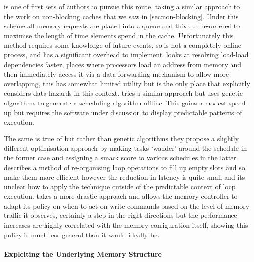 \citet{kiniwaLookaheadSchedulingRequests1998} is one of first sets of authors to pursue this route, taking a similar approach to the work on non-blocking caches that we saw in \ref{sec:non-blocking}. Under this scheme all memory requests are placed into a queue and this can re-ordered to maximise the length of time elements spend in the cache. Unfortunately this method requires some knowledge of future events, so is not a completely online process, and has a significant overhead to implement. \citet{yangOverlappingDependentLoads2006} looks at resolving load-load dependencies faster, places where processors load an address from memory and then immediately access it via a data forwarding mechanism to allow more overlapping, this has somewhat limited utility but is the only place that explicitly considers data hazards in this context. \citet{luoDesignRealizationOptimized2010} tries a similar approach but uses genetic algorithms to generate a scheduling algorithm offline. This gains a modest speed-up but requires the software under discussion to display predictable patterns of execution. 

The same is true of \citet{wei-chetsengOptimalSchedulingMinimize2010, kegleyPredictiveCacheModeling2011} but rather than genetic algorithms they propose a slightly different optimisation approach by making tasks `wander' around the schedule in the former case and assigning a \gls{smack} score to various schedules in the latter. \citet{qaziOptimizationAccessLatency2016} describes a method of re-organising loop operations to fill up empty slots and so make them more efficient however the reduction in latency is quite small and its unclear how to apply the technique outside of the predictable context of loop execution. \citet{modgilImprovingPerformanceChip2018} takes a more drastic approach and allows the memory controller to adapt its policy on when to act on write commands based on the level of memory traffic it observes, certainly a step in the right directions but the performance increases are highly correlated with the memory configuration itself, showing this policy is much less general than it would ideally be.

\paragraph{Exploiting the Underlying Memory Structure}

